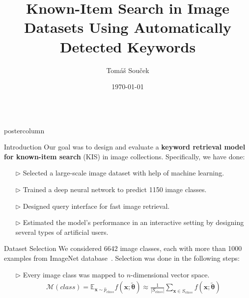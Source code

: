 \documentclass{beamer}
\title{\huge Known-Item Search in Image Datasets Using Automatically Detected Keywords}
\author{Tomáš Souček}
\institute{Faculty of Mathematics and Physics, Charles University}
\date{\today}
\newlength{\columnheight}
\begin{document}
	\begin{frame}
	\begin{columns}
		\begin{column}{.5\textwidth}
			\begin{beamercolorbox}[center]{postercolumn}
				\begin{minipage}{.98\textwidth}  %
					\parbox[t][\columnheight]{\textwidth}{ %
						\begin{myblock}{Introduction}
							Our goal was to design and evaluate a \textbf{keyword retrieval model for known-item search} (KIS) in image collections. Specifically, we have done:
							\par
							\vspace{1ex}
							\begin{minipage}{\textwidth-6ex-3ex}
								\raggedright
								\begin{itemize}
									\item[$\triangleright$] Selected a large-scale image dataset with help of machine learning.
									\item[$\triangleright$] Trained a deep neural network to predict 1150 image classes.
									\item[$\triangleright$] Designed query interface for fast image retrieval.
									\item[$\triangleright$] Estimated the model’s performance in an interactive setting by designing several types of artificial users.
								\end{itemize}
							\end{minipage}
						\end{myblock}\vfill
						\begin{myblock}{Dataset Selection}
							We considered 6642 image classes, each with more than 1000 examples from ImageNet database~\cite{ILSVRC15}. Selection was done in the following steps:
							\par
							\vspace{1ex}
							\begin{minipage}{\textwidth-6ex-3ex}
								\raggedright
								\begin{itemize}
									\item[$\triangleright$] Every image class was mapped to $n$-dimensional vector space.
									\begin{align*}
									\mathcal{M}(class)=\mathbb{E}_{\bm{x}\sim \hat{p}_{class}}f(\bm{x};\bm{\tilde{\theta}})\approx\frac{1}{|S_{class}|} \sum_{\bm{x}\in S_{class}} f(\bm{x};\bm{\tilde{\theta}})

\end{align*}
\end{itemize}
\end{minipage}
\end{myblock}}
\end{minipage}
\end{beamercolorbox}
\end{column}
\end{columns}
\end{frame}
\end{document}
